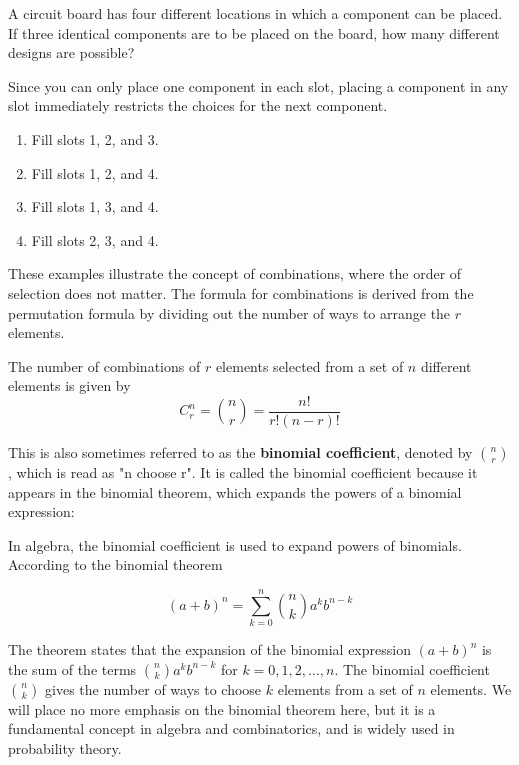 \begin{example}
A circuit board has four different locations in which a component can be placed. If three identical components are to be placed on the board, how many different designs are possible?
\end{example}

\begin{solution}
    Since you can only place one component in each slot, placing a component in any slot immediately restricts the choices for the next component.
        
    \begin{enumerate}
        \item Fill slots 1, 2, and 3.
        \item Fill slots 1, 2, and 4.
        \item Fill slots 1, 3, and 4.
        \item Fill slots 2, 3, and 4.
    \end{enumerate}
\end{solution}

These examples illustrate the concept of combinations, where the order of selection does not matter. The formula for combinations is derived from the permutation formula by dividing out the number of ways to arrange the $r$ elements.

\begin{definition}[Combinations]
    The number of combinations of $r$ elements selected from a set of $n$ different elements is given by
    \[
    C_r^n = \binom{n}{r} = \frac{n!}{r!(n-r)!}
    \]
\end{definition}

This is also sometimes referred to as the \textbf{binomial coefficient}, denoted by $\binom{n}{r}$, which is read as "n choose r". It is called the binomial coefficient because it appears in the binomial theorem, which expands the powers of a binomial expression:

\begin{theorem}
    In algebra, the binomial coefficient is used to expand powers of binomials. According to the binomial theorem

$$
(a+b)^n=\sum_{k=0}^n\binom{n}{k} a^k b^{n-k}
$$

\end{theorem}

The theorem states that the expansion of the binomial expression $(a+b)^n$ is the sum of the terms $\binom{n}{k} a^k b^{n-k}$ for $k=0,1,2,\ldots,n$. The binomial coefficient $\binom{n}{k}$ gives the number of ways to choose $k$ elements from a set of $n$ elements. We will place no more emphasis on the binomial theorem here, but it is a fundamental concept in algebra and combinatorics, and is widely used in probability theory.

